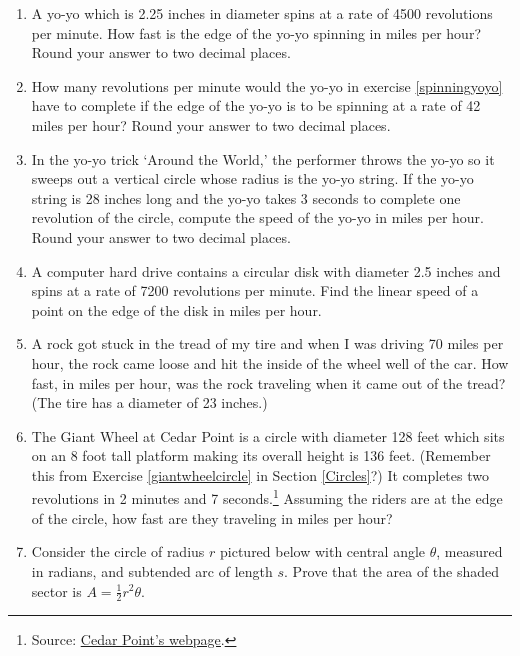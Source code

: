 \begin{enumerate}

\setcounter{enumi}{\value{HW}}

\item  \label{spinningyoyo} A yo-yo which is 2.25 inches in diameter spins at a rate of 4500 revolutions per minute.  How fast is the edge of the yo-yo spinning in miles per hour?  Round your answer to two decimal places.

\item  How many revolutions per minute would the yo-yo in exercise \ref{spinningyoyo} have to complete if the edge of the yo-yo is to be spinning at a rate of 42 miles per hour?  Round your answer to two decimal places.

\item  \label{yoyotrick} In the yo-yo trick `Around the World,' the performer throws the yo-yo so it sweeps out a vertical circle whose radius is the yo-yo string. If the yo-yo string is 28 inches long and the yo-yo takes 3 seconds to complete one revolution of the circle, compute the speed of the yo-yo in miles per hour.  Round your answer to two decimal places.

\item A computer hard drive contains a circular disk with diameter 2.5 inches and spins at a rate of 7200 revolutions per minute.  Find the linear speed of a point on the edge of the disk in miles per hour. \label{harddrive} 

\item A rock got stuck in the tread of my tire and when I was driving 70 miles per hour, the rock came loose and hit the inside of the wheel well of the car.  How fast, in miles per hour, was the rock traveling when it came out of the tread?  (The tire has a diameter of 23 inches.)

\item The Giant Wheel at Cedar Point is a circle with diameter 128 feet which sits on an 8 foot tall platform making its overall height is 136 feet.  (Remember this from Exercise \ref{giantwheelcircle} in Section \ref{Circles}?)  It completes two revolutions in 2 minutes and 7 seconds.\footnote{Source: \href{http://www.cedarpoint.com/public/park/rides/tranquil/giant_wheel.cfm}{\underline{Cedar Point's webpage}}.}  Assuming the riders are at the edge of the circle, how fast are they traveling in miles per hour?
\label{giantwheelmotion}

\item  Consider the circle of radius $r$ pictured below with central angle $\theta$, measured in radians,  and subtended arc of length $s$.  Prove that the area of the shaded sector is $A = \frac{1}{2} r^{2} \theta$. 


\end{enumerate}
